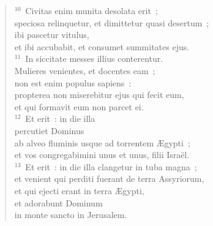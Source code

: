\begin{flushleft}
\begin{verse}
${}^{10}$~Civitas enim munita desolata erit~;\\ speciosa relinquetur, et dimittetur quasi desertum~;\\ ibi pascetur vitulus,\\ et ibi accubabit, et consumet summitates ejus.\\
${}^{11}$~In siccitate messes illius conterentur.\\ Mulieres venientes, et docentes eam~;\\ non est enim populus sapiens~:\\ propterea non miserebitur ejus qui fecit eum,\\ et qui formavit eum non parcet ei.\\
${}^{12}$~Et erit~: in die illa\\ percutiet Dominus\\ ab alveo fluminis usque ad torrentem \AE gypti~;\\ et vos congregabimini unus et unus, filii Isra\"el.\\
${}^{13}$~Et erit~: in die illa clangetur in tuba magna~;\\ et venient qui perditi fuerant de terra Assyriorum,\\ et qui ejecti erant in terra \AE gypti,\\ et adorabunt Dominum\\ in monte sancto in Jerusalem.\end{verse}\end{flushleft}


